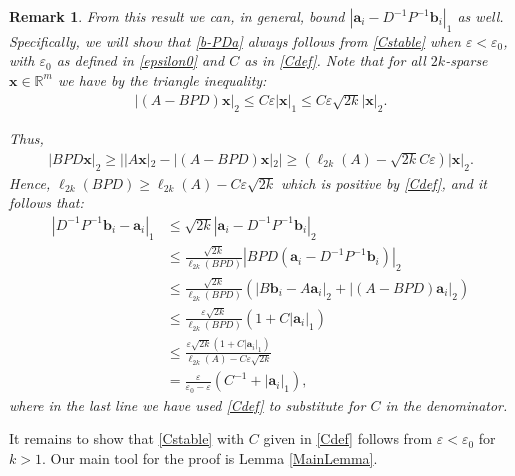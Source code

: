 \documentclass[journal, onecolumn]{IEEEtran}
\newtheorem{remark}{Remark}
\begin{document}
\begin{remark}\label{b-PDaProof}
From this result we can, in general, bound $|\mathbf{a}_i - D^{-1}P^{-1}\mathbf{b}_i|_1$ as well. Specifically, we will show that \eqref{b-PDa} always follows from \eqref{Cstable} when $\varepsilon < \varepsilon_0$, with $\varepsilon_0$ as defined in \eqref{epsilon0} and $C$ as in \eqref{Cdef}. Note that for all $2k$-sparse $\mathbf{x} \in \mathbb{R}^m$ we have by the triangle inequality:
\begin{align*}
|(A-BPD)\mathbf{x}|_2 
\leq C\varepsilon|\mathbf{x}|_1
\leq C \varepsilon \sqrt{2k}  |\mathbf{x}|_2.
\end{align*}

Thus,
\begin{align*}
|BPD\mathbf{x}|_2 
\geq | |A\mathbf{x}|_2 - |(A-BPD)\mathbf{x}|_2 |
\geq (\ell_{2k}(A) - \sqrt{2k}C\varepsilon ) |\mathbf{x}|_2.
\end{align*}
Hence, $\ell_{2k}(BPD) \geq \ell_{2k}(A) - C\varepsilon \sqrt{2k}$ which is positive by \eqref{Cdef}, and it follows that:
\begin{align*}
|D^{-1}P^{-1}\mathbf{b}_i - \mathbf{a}_i|_1
&\leq \sqrt{2k} |\mathbf{a}_i - D^{-1}P^{-1}\mathbf{b}_i|_2 \\
&\leq \frac{\sqrt{2k}}{\ell_{2k}(BPD)}|BPD(\mathbf{a}_i - D^{-1}P^{-1}\mathbf{b}_i)|_2 \\
&\leq \frac{\sqrt{2k}}{\ell_{2k}(BPD)} (|B\mathbf{b}_i - A\mathbf{a}_i|_2 + |(A - BPD)\mathbf{a}_i|_2) \\
&\leq \frac{\varepsilon\sqrt{2k}}{\ell_{2k}(BPD)}(1+C|\mathbf{a}_i|_1) \\
&\leq \frac{\varepsilon\sqrt{2k}(1+C|\mathbf{a}_i|_1)}{\ell_{2k}(A) - C\varepsilon\sqrt{2k}} \\
&= \frac{\varepsilon }{\varepsilon_0 - \varepsilon} \left( C^{-1}+|\mathbf{a}_i|_1 \right),
\end{align*}
%
where in the last line we have used \eqref{Cdef} to substitute for $C$ in the denominator.  
\end{remark}


It remains to show that \eqref{Cstable} with $C$ given in \eqref{Cdef} follows from $\varepsilon < \varepsilon_0$ for $k > 1$. Our main tool for the proof is Lemma \ref{MainLemma}.


\end{document}
